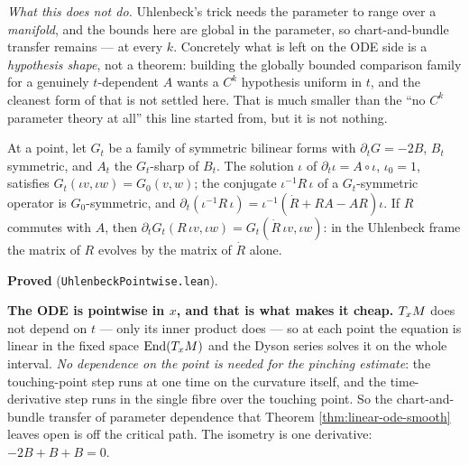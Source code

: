 \begin{theorem}
  \emph{What this does not do.} Uhlenbeck's trick needs the parameter to range over a
  \emph{manifold}, and the bounds here are global in the parameter, so chart-and-bundle transfer
  remains --- at every $k$. Concretely what is left on the ODE side is a \emph{hypothesis
  shape}, not a theorem: building the globally bounded comparison family for a genuinely
  $t$-dependent $A$ wants a $C^k$ hypothesis uniform in $t$, and the cleanest form of that is
  not settled here. That is much smaller than the ``no $C^k$ parameter theory at all'' this line
  started from, but it is not nothing.
\end{theorem}

\begin{lemma}
  \label{lem:uhlenbeck-pointwise}
  \leanok
  At a point, let $G_t$ be a family of symmetric bilinear forms with
  $\partial_t G = -2B$, $B_t$ symmetric, and $A_t$ the $G_t$-sharp of $B_t$. The solution
  $\iota$ of $\partial_t\iota = A\circ\iota$, $\iota_0 = 1$, satisfies
  $G_t(\iota v,\iota w) = G_0(v,w)$; the conjugate $\iota^{-1}R\,\iota$ of a
  $G_t$-symmetric operator is $G_0$-symmetric, and
  $\partial_t(\iota^{-1}R\,\iota) = \iota^{-1}(\dot R + RA - AR)\iota$. If $R$ commutes with
  $A$, then $\partial_t G_t(R\,\iota v, \iota w) = G_t(\dot R\,\iota v, \iota w)$: in the
  Uhlenbeck frame the matrix of $R$ evolves by the matrix of $\dot R$ alone.

  \textbf{Proved} (\texttt{UhlenbeckPointwise.lean}).

  \textbf{The ODE is pointwise in $x$, and that is what makes it cheap.} $T_xM$ does not
  depend on $t$ --- only its inner product does --- so at each point the equation is linear in
  the fixed space $\operatorname{End}(T_xM)$ and the Dyson series solves it on the whole
  interval. \emph{No dependence on the point is needed for the pinching estimate}: the
  touching-point step runs at one time on the curvature itself, and the time-derivative step
  runs in the single fibre over the touching point. So the chart-and-bundle transfer of
  parameter dependence that Theorem \ref{thm:linear-ode-smooth} leaves open is off the critical
  path. The isometry is one derivative: $-2B + B + B = 0$.
\end{lemma}

